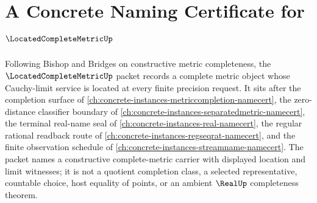 \chapter{A Concrete Naming Certificate for $\LocatedCompleteMetricUp$}
\label{ch:concrete-instances-located-complete-metric-namecert}

Following Bishop and Bridges on constructive metric completeness, the $\LocatedCompleteMetricUp$ packet records a complete metric object whose Cauchy-limit service is located at every finite precision request. It sits after the completion surface of \autoref{ch:concrete-instances-metriccompletion-namecert}, the zero-distance classifier boundary of \autoref{ch:concrete-instances-separatedmetric-namecert}, the terminal real-name seal of \autoref{ch:concrete-instances-real-namecert}, the regular rational readback route of \autoref{ch:concrete-instances-regseqrat-namecert}, and the finite observation schedule of \autoref{ch:concrete-instances-streamname-namecert}. The packet names a constructive complete-metric carrier with displayed location and limit witnesses; it is not a quotient completion class, a selected representative, countable choice, host equality of points, or an ambient $\RealUp$ completeness theorem.

